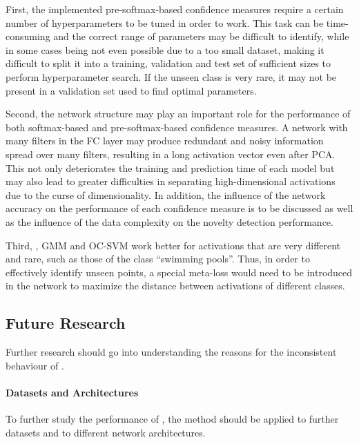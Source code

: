 \documentclass[10pt]{article}
\begin{document}
\label{subsec:limitaitons}
First, the implemented pre-softmax-based confidence measures require a certain number of hyperparameters to be tuned in order to work. This task can be time-consuming and the correct range of parameters may be difficult to identify, while in some cases being not even possible due to a too small dataset, making it difficult to split it into a training, validation and test set of sufficient sizes to perform hyperparameter search. If the unseen class is very rare, it may not be present in a validation set used to find optimal parameters.

Second, the network structure may play an important role for the performance of both softmax-based and pre-softmax-based confidence measures. A network with many filters in the \gls{FC} layer may produce redundant and noisy information spread over many filters, resulting in a long activation vector even after \gls{PCA}. This not only deteriorates the training and prediction time of each model but may also lead to greater difficulties in separating high-dimensional activations due to the curse of dimensionality. In addition, the influence of the network accuracy on the performance of each confidence measure is to be discussed as well as the influence of the data complexity on the novelty detection performance.

Third, , \gls{GMM} and \gls{OC-SVM} work better for activations that are very different and rare, such as those of the class ``swimming pools''. Thus, in order to effectively identify unseen points, a special meta-loss would need to be introduced in the network to maximize the distance between activations of different classes.


\subsection{Future Research}
\label{subsec:future_research}

Further research should go into understanding the reasons for the inconsistent behaviour of . 

\paragraph{Datasets and Architectures} To further study the performance of , the method should be applied to further datasets and to different network architectures.
\end{document}
